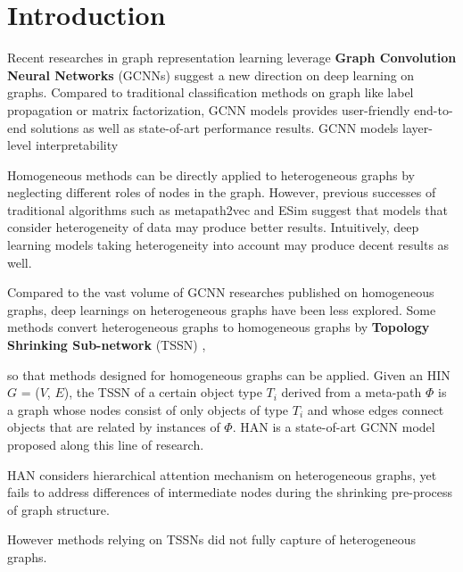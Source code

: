 \section{Introduction}
\label{sec:intro}
Recent researches in graph representation learning leverage
\textbf{Graph Convolution Neural Networks} (GCNNs) suggest a new direction on deep learning on graphs. Compared to traditional classification methods on graph like label propagation or matrix factorization, GCNN models provides user-friendly end-to-end solutions as well as state-of-art performance results. GCNN models layer-level interpretability


Homogeneous methods can be directly applied to heterogeneous graphs by neglecting different roles of nodes in the graph.
However, previous successes of traditional algorithms such as metapath2vec \cite{DongCS17} and ESim \cite{ShangQLKHP16} suggest that models that consider heterogeneity of data may produce better results. Intuitively, deep learning models taking heterogeneity into account may produce decent results as well.

Compared to the vast volume of GCNN researches published on homogeneous graphs, deep learnings on heterogeneous graphs have been less explored. 
Some methods convert heterogeneous graphs to homogeneous graphs by
\textbf{Topology Shrinking Sub-network} (TSSN) \cite{WanOKH15}, 

so that methods designed for homogeneous graphs can be applied. 
Given an HIN $G$ = ($V$, $E$), the TSSN of a certain object type $T_i$ derived from a meta-path $\Phi$ is a graph whose nodes consist of only objects of type $T_i$ and whose edges connect objects that are related by instances of $\Phi$.
HAN is a state-of-art GCNN model proposed along this line of research.
  
  
HAN considers hierarchical attention mechanism on heterogeneous graphs, yet fails to address differences of intermediate nodes during the shrinking pre-process of graph structure. 

However methods relying on TSSNs did not fully capture of heterogeneous graphs.

